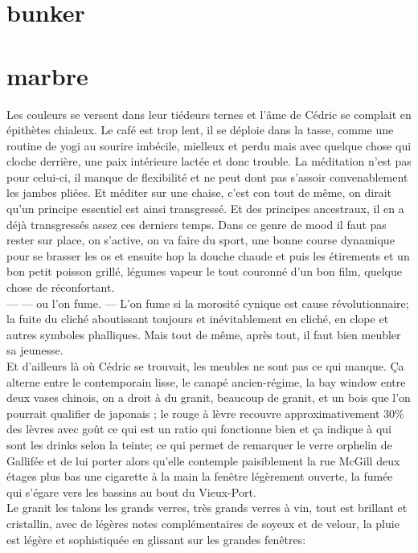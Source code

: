 \documentclass{article}
\begin{document}
\section{bunker}


\section{marbre}

Les couleurs se versent dans leur tiédeurs ternes et l'âme de Cédric se complait
en épithètes chialeux. Le café est trop lent, il se déploie dans la tasse, comme
une routine de yogi au sourire imbécile, mielleux et perdu mais avec quelque
chose qui cloche derrière, une paix intérieure lactée et donc trouble. La
méditation n'est pas pour celui-ci, il manque de flexibilité et ne peut dont pas
s'assoir convenablement les jambes pliées. Et méditer sur une chaise, c'est con
tout de même, on dirait qu'un principe essentiel est ainsi transgressé. Et des
principes ancestraux, il en a déjà transgressés assez ces derniers temps. Dans
ce genre de mood il faut pas rester sur place, on s'active, on va faire du
sport, une bonne course dynamique pour se brasser les os et ensuite hop la
douche chaude et puis les étirements et un bon petit poisson grillé, légumes
vapeur le tout couronné d'un bon film, quelque chose de réconfortant. \\--- ---
ou l'on fume. --- L'on fume si la morosité cynique est cause révolutionnaire; la
fuite du cliché aboutissant toujours et inévitablement en cliché, en clope et
autres symboles phalliques. Mais tout de même, après tout, il faut bien meubler
sa jeunesse. \\

Et d'ailleurs là où Cédric se trouvait, les meubles ne sont pas ce qui manque.
Ça alterne entre le contemporain lisse, le canapé ancien-régime, la bay window
entre deux vases chinois, on a droit à du granit, beaucoup de granit, et un bois
que l'on pourrait qualifier de japonais ; le rouge à lèvre recouvre
approximativement 30\% des lèvres avec goût ce qui est un ratio qui fonctionne
bien et ça indique à qui sont les drinks selon la teinte; ce qui permet de
remarquer le verre orphelin de Gallifée et de lui porter alors qu'elle contemple
paisiblement la rue McGill deux étages plus bas une cigarette à la main la
fenêtre légèrement ouverte, la fumée qui s'égare vers les bassins au bout du
Vieux-Port. \\

Le granit les talons les grands verres, très grands verres à vin, tout est
brillant et cristallin, avec de légères notes complémentaires de soyeux et de
velour, la pluie est légère et sophistiquée en glissant sur les grandes
fenêtres:
\end{document}
